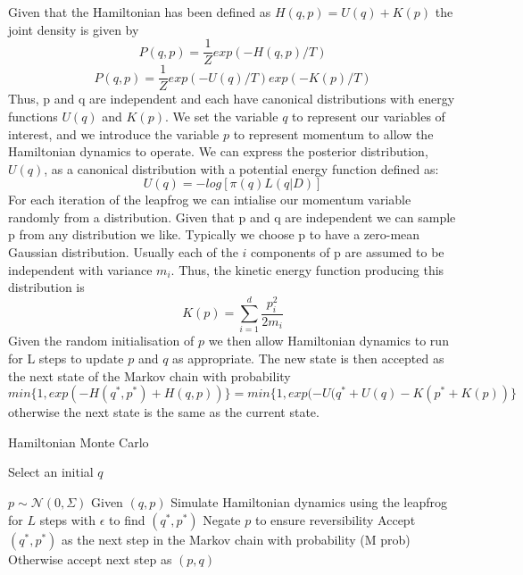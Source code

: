 \documentclass[11pt]{article}
\begin{document}
Given that the Hamiltonian has been defined as $H(q,p) = U(q) + K(p)$ the joint density is given by
\begin{equation}
P(q,p) = \frac{1}{Z}exp(-H(q,p)/T)
\end{equation}
\begin{equation}
P(q,p) = \frac{1}{Z}exp(-U(q)/T)exp(-K(p)/T)
\end{equation}
Thus, p and q are independent and each have canonical distributions with energy functions $U(q)$ and $K(p)$. We set the variable $q$ to represent our variables of interest, and we introduce the variable $p$ to represent momentum to allow the Hamiltonian dynamics to operate. We can express the posterior distribution, $U(q)$, as a canonical distribution with a potential energy function defined as:
\begin{equation}
U(q) = -log[\pi(q)L(q|D)]
\end{equation}
For each iteration of the leapfrog we can intialise our momentum variable randomly from a distribution. Given that p and q are independent we can sample p from any distribution we like. Typically we choose p to have a zero-mean Gaussian distribution. Usually each of the $i$ components of p are assumed to be independent with variance $m_{i}$. Thus, the kinetic energy function producing this distribution is
\begin{equation}
K(p) = \sum_{i=1}^{d} \frac{p_{i}^{2}}{2m_{i}}
\end{equation}
Given the random initialisation of $p$ we then allow Hamiltonian dynamics to run for L steps to update $p$ and $q$ as appropriate. The new state is then accepted as the next state of the Markov chain with probability
\begin{equation}
min\{1,exp(-H(q^{*},p^{*})+H(q,p))\} = min\{1, exp(-U(q^{*}+U(q)-K(p^{*}+K(p))\}
\end{equation}
otherwise the next state is the same as the current state.

\begin{algorithm}
\caption{Hamiltonian Monte Carlo}\label{euclid}
\begin{algorithmic}[1] 
\State Select an initial $q$ 

\State $p\sim \mathcal{N}(0,\Sigma)$
\State Given $(q,p)$ Simulate Hamiltonian dynamics using the leapfrog for $L$ steps with $\epsilon$ to find $(q^{*},p^{*})$ 
\State Negate $p$ to ensure reversibility 
\State Accept $(q^{*}, p^{*})$ as the next step in the Markov chain with probability (M prob) 
\State Otherwise accept next step as $(p,q)$ 
\end{algorithmic}
\end{algorithm}
\end{document}
